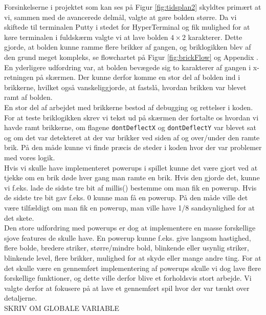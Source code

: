 Forsinkelserne i projektet som kan ses på Figur \ref{fig:tidsplan2} skyldtes primært at vi, sammen med de avancerede delmål, valgte at gøre bolden større. Da vi skiftede til terminalen Putty i stedet for HyperTerminal og fik mulighed for at køre terminalen i fuldskærm valgte vi at lave bolden $4\times2$ karakterer. Dette gjorde, at bolden kunne ramme flere brikker af gangen, og briklogikken blev af den grund meget kompleks, se flowchartet på Figur \ref{fig:brickFlow} og  Appendix . En yderligere udfordring var, at bolden bevægede sig to karakterer af gangen i x-retningen på skærmen. Der kunne derfor komme en stor del af bolden ind i brikkerne, hvilket også vanskeliggjorde, at fastslå, hvordan brikken var blevet ramt af bolden. \\ 
En stor del af arbejdet med brikkerne bestod af debugging og rettelser i koden. For at teste briklogikken skrev vi tekst ud på skærmen der fortalte os hvordan vi havde ramt brikkerne, om flagene \texttt{dontDeflectX} og \texttt{dontDeflectY} var blevet sat og om det var detekteret at der var brikker ved siden af og over/under den ramte brik. På den måde kunne vi finde præcis de steder i koden hvor der var problemer med vores logik.\\

Hvis vi skulle have implementeret powerups i spillet kunne det være gjort ved at tjekke om en brik døde hver gang man ramte en brik. Hvis den gjorde det, kunne vi f.eks. lade de sidste tre bit af millis() bestemme om man fik en powerup. Hvis de sidste tre bit gav f.eks. 0 kunne man få en powerup. På den måde ville det være tilfældigt om man fik en powerup, man ville have 1/8 sandsynlighed for at det skete. \\

Den store udfordring med powerups er dog at implementere en masse forskellige sjove features de skulle have. En powerup kunne f.eks. give langsom hastighed, flere bolde, bredere striker, større/mindre bold, blinkende eller usynlig striker, blinkende level, flere brikker, mulighed for  at skyde eller mange andre ting. For at det skulle være en gennemført implementering af powerups skulle vi dog lave flere forskellige funktioner, og dette ville derfor blive et forholdsvis stort arbejde. Vi valgte derfor at fokusere på at lave et gennemført spil hvor der var tænkt over detaljerne.\\


SKRIV OM GLOBALE VARIABLE


